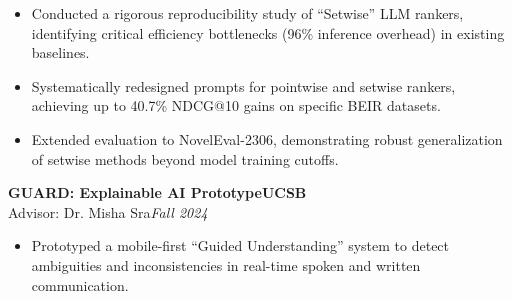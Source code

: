 \documentclass[11pt]{article}
\newcommand{\CVEntry}[4]{%
  \vspace{0.4em} %
  {\bfseries #1}\hfill {\bfseries #2}\\[0.1em] 
  #3\hfill \textit{#4}
}
\begin{document}
{\begin{itemize}
    \item Conducted a rigorous reproducibility study of ``Setwise'' LLM rankers, identifying critical efficiency bottlenecks (96\% inference overhead) in existing baselines.
    \item Systematically redesigned prompts for pointwise and setwise rankers, achieving up to 40.7\% NDCG@10 gains on specific BEIR datasets.
    \item Extended evaluation to NovelEval-2306, demonstrating robust generalization of setwise methods beyond model training cutoffs.
  \end{itemize}
  \vspace{0.4em}
  \CVEntry
    {GUARD: Explainable AI Prototype}
    {UCSB}
    {Advisor: Dr. Misha Sra}
    {Fall 2024}
  \begin{itemize}
    \item Prototyped a mobile-first ``Guided Understanding'' system to detect ambiguities and inconsistencies in real-time spoken and written communication.


\end{itemize}}
\end{document}
